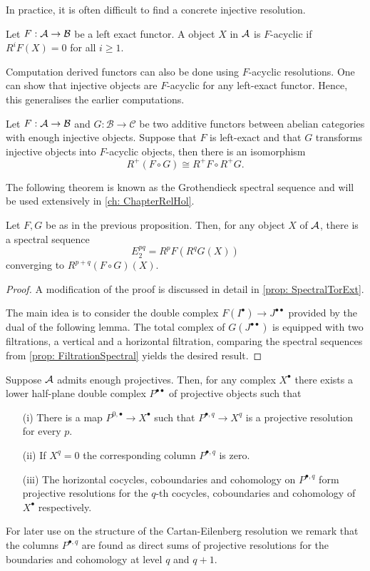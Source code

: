 In practice, it is often difficult to find a concrete injective resolution.
\begin{definition}
 Let $F:\AA \to \mathcal{B}$ be a left exact functor.
 A object $X$ in $\AA$ is $F$-acyclic if $R^iF(X) = 0$ for all $i\geq 1$.
\end{definition}
Computation derived functors can also be done using $F$-acyclic resolutions.
One can show that injective objects are $F$-acyclic for any left-exact functor.
Hence, this generalises the earlier computations.
\begin{proposition}{\cite[Chapter 1]{dimca2004sheaves}}\label{prop: GrothendieckIsomorphism}
  Let $F:\AA \to \mathcal{B}$ and $G:\mathcal{B}\to \mathcal{C}$ be two additive functors between abelian categories with enough injective objects. Suppose that $F$ is left-exact and that $G$ transforms injective objects into $F$-acyclic objects, then there is an isomorphism
  $$R^+(F\circ G) \cong R^+F \circ R^+ G.$$
\end{proposition}
The following theorem is known as the Grothendieck spectral sequence and will be used extensively in \cref{ch: ChapterRelHol}.
\begin{theorem}{\cite[Chapter 5]{dimca2004sheaves}}
  Let $F,G$ be as in the previous proposition. Then, for any object $X$ of $\AA$, there is a spectral sequence
  $$E_2^{pq} = R^pF(R^qG(X)) $$
  converging to $R^{p+q}(F\circ G)(X).$
\end{theorem}
\begin{proof}
  A modification of the proof is discussed in detail in \cref{prop: SpectralTorExt}.

  The main idea is to consider the double complex $F(I^\bullet)\to J^{\bullet\bullet}$ provided by the dual of the following lemma.
  The total complex of $G(J^{\bullet\bullet})$ is equipped with two filtrations, a vertical and a horizontal filtration, comparing the spectral sequences from \cref{prop: FiltrationSpectral} yields the desired result.
\end{proof}
\begin{proposition}{\cite[Chapter 1]{dimca2004sheaves}}\label{prop: Cartan-Eilenberg}
  Suppose $\AA$ admits enough projectives. Then, for any complex $X^\bullet$ there exists a lower half-plane double complex $P^{\bullet\bullet}$ of projective objects such that
  \begin{enumerate}
    \item[(i)] There is a map $P^{0,\bullet}\to X^\bullet$ such that $P^{\bullet,q}\to X^{q}$ is a projective resolution for every $p$.
    \item[(ii)] If $X^q = 0$ the corresponding column $P^{\bullet,q}$ is zero.
    \item[(iii)] The horizontal cocycles, coboundaries and cohomology on $P^{\bullet,q}$ form projective resolutions for the $q$-th cocycles, coboundaries and cohomology of $X^\bullet$ respectively.
  \end{enumerate}
\end{proposition}
For later use on the structure of the Cartan-Eilenberg resolution we remark that the columns $P^{\bullet,q}$ are found as direct sums of projective resolutions for the boundaries and cohomology at level $q$ and $q+1$.

